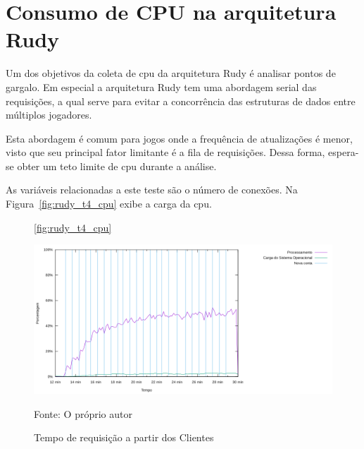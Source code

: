 \section{Consumo de CPU na arquitetura Rudy}

Um dos objetivos da coleta de \ac{cpu} da arquitetura Rudy é analisar pontos de gargalo.
%
Em especial a arquitetura Rudy tem uma abordagem serial das requisições, a qual serve para evitar a concorrência das estruturas de dados entre múltiplos jogadores.

Esta abordagem é comum para jogos onde a frequência de atualizações é menor, visto que seu principal fator limitante é a fila de requisições.
%
Dessa forma, espera-se obter um teto limite de \ac{cpu} durante a análise.

As variáveis relacionadas a este teste são o número de conexões.
%
Na Figura~\ref{fig:rudy_t4_cpu} exibe a carga da \ac{cpu}.


\begin{figure}[htb!]
    \ref{fig:rudy_t4_cpu}
    \caption{Tempo de requisição a partir dos Clientes}
    \includegraphics[width=\textwidth]{metricas_rudy_t4/cpu.png}
    \centering
    
    Fonte: O próprio autor
\end{figure}

